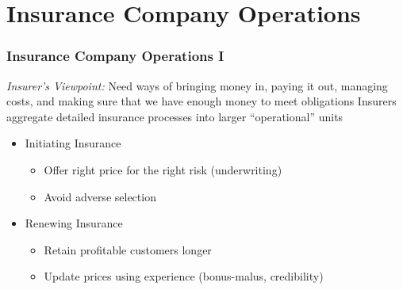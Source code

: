 \documentclass[serif,10pt]{beamer}
\begin{document}
\section{Insurance Company Operations}

\begin{frame}%
\frametitle{Insurance Company Operations I} \textit{Insurer's
Viewpoint:}
\newline\checkmark Need ways of bringing money in, paying it out, managing costs, and making sure that we have enough money to meet
obligations \vspace{2mm}
\newline\checkmark Insurers aggregate detailed insurance processes into larger ``operational''
units \vspace{2mm}
  \begin{itemize}
 \item Initiating Insurance \vspace{2mm}
\begin{itemize}
 \item Offer right price for the right risk (underwriting) \vspace{2mm}
 \item Avoid adverse selection \vspace{2mm}
 \end{itemize}
 \item Renewing Insurance \vspace{2mm}
   \begin{itemize}
 \item Retain profitable customers longer \vspace{2mm}
 \item Update prices using experience (bonus-malus, credibility) \vspace{2mm}
\end{itemize}
\end{itemize}
\end{frame}
\end{document}
